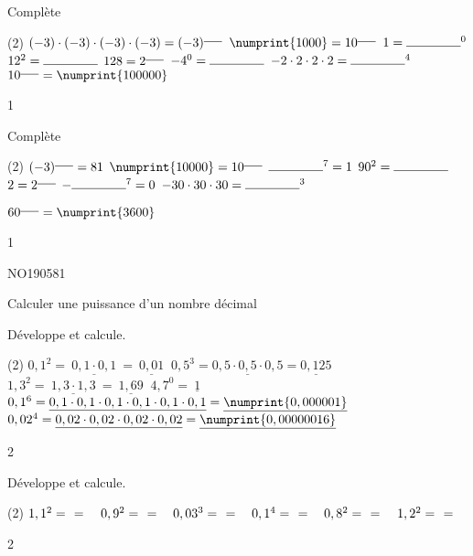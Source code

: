 \documentclass[a4paper,11pt]{report}
\begin{document}
\begin{exop}{
Complète
\begin{tasks}(2)
    \task $(-3)\cdot(-3)\cdot(-3)\cdot(-3)=(-3)^{\ligne{0.5}}$
    \task $\numprint{1000}=10^{\ligne{0.5}}$
    \task $1=\ligne{1.5}^0$
    \task $12^2=\ligne{1.5}$
    \task $128=2^{\ligne{0.5}}$
    \task $-4^0=\ligne{1.5}$
    \task $-2\cdot2\cdot2\cdot2=\ligne{1.5}^4$
    \task $10^{\ligne{0.5}}=\numprint{100000}$
\end{tasks}
}{1}
\end{exop}

\begin{exop}{
Complète
\begin{tasks}(2)
    \task $(-3)^{\ligne{0.5}}=81$
    \task $\numprint{10000}=10^{\ligne{0.5}}$
    \task $\ligne{1.5}^7=1$
    \task $90^2=\ligne{1.5}$
    \task $2=2^{\ligne{0.5}}$
    \task $-\ligne{1.5}^7=0$
    \task $-30\cdot30\cdot30=\ligne{1.5}^3$
    
    \task $60^{\ligne{0.5}}=\numprint{3600}$
\end{tasks}
}{1}
\end{exop}

\begin{exof}{NO190}{58}{1} %
\end{exof}

\begin{resolu}{Calculer une puissance d'un nombre décimal}{
Développe et calcule.
\begin{tasks}(2)
    \task $0,1^2=\underline{~0,1\cdot0,1~}=\underline{~0,01~}$
    \task $0,5^3=\underline{0,5\cdot0,5\cdot0,5}=\underline{0,125}$
    \task $1,3^2=\underline{~1,3\cdot1,3~}=\underline{~1,69~}$
    \task $4,7^0=\underline{~1~}$
    \task* $0,1^6=\underline{0,1\cdot0,1\cdot0,1\cdot0,1\cdot0,1\cdot0,1}=\underline{\numprint{0,000001}}$
    \task* $0,02^4=\underline{0,02\cdot0,02\cdot0,02\cdot0,02}=\underline{\numprint{0,00000016}}$
\end{tasks}
\bigskip  
}{2}
\end{resolu}


\begin{exop}{
Développe et calcule. %
\begin{tasks}(2)
    \task $1,1^2=~\hrulefill~=$ ~
    \task $0,9^2=~\hrulefill~=$ ~
    \task $0,03^3=~\hrulefill~=$ ~
    \task $0,1^4=~\hrulefill~=$ ~
    \task $0,8^2=~\hrulefill~=$ ~
    \task $1,2^2=~\hrulefill~=$ ~
\end{tasks}
}{2}
\end{exop}
\end{document}

